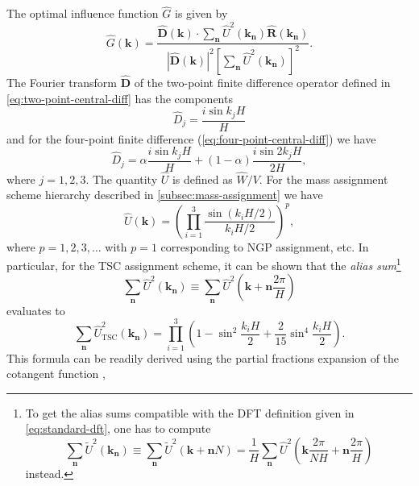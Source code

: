 The optimal influence function $\hat{G}$ is given by
\begin{equation*}
    \hat{G}(\mathbf{k}) = \frac{\hat{\mathbf{D}}(\mathbf{k}) \cdot \sum_{\mathbf{n}}\hat{U}^2(\mathbf{k_\mathbf{n}}) \hat{\mathbf{R}}(\mathbf{k}_\mathbf{n})}{|\hat{\mathbf{D}}(\mathbf{k})|^2 \left[ \sum_{\mathbf{n}}\hat{U}^2(\mathbf{k}_\mathbf{n}) \right]^2}.
\end{equation*}
The Fourier transform $\hat{\mathbf{D}}$ of the two-point finite difference operator defined in \autoref{eq:two-point-central-diff} has the components
\begin{equation*}
    \hat{D}_j = \frac{i\sin k_j H}{H}
\end{equation*}
and for the four-point finite difference (\autoref{eq:four-point-central-diff}) we have
\begin{equation*}
    \hat{D}_j = \alpha\frac{i\sin k_j H}{H} + (1- \alpha)\frac{i\sin 2k_j H}{2H},
\end{equation*}
where $j=1,2,3$.
The quantity $\hat{U}$ is defined as $\hat{W}/V$.
For the mass assignment scheme hierarchy described in \autoref{subsec:mass-assignment} we have
\begin{equation*}
    \hat{U}(\mathbf{k}) = \left(\prod_{i=1}^{3}\frac{\sin(k_i H / 2)}{k_i H / 2}\right)^{p},
\end{equation*}
where $p=1,2,3,\dots$ with $p=1$ corresponding to NGP assignment, etc.
In particular, for the TSC assignment scheme, it can be shown that the \textit{alias sum}\footnote{
    To get the alias sums compatible with the DFT definition given in \autoref{eq:standard-dft}, one has to compute
    \begin{equation*}
        \sum_{\mathbf{n}} \tilde{U}^2(\mathbf{k}_\mathbf{n})
        \equiv \sum_\mathbf{n}\tilde{U}^2(\mathbf{k}+\mathbf{n}N)
        = \frac{1}{H}\sum_\mathbf{n}\hat{U}^2\left(\mathbf{k}\frac{2\pi}{NH}+\mathbf{n}\frac{2\pi}{H}\right)
    \end{equation*}
    instead.
}
\begin{equation*}
    \sum_{\mathbf{n}}\hat{U}^2(\mathbf{k}_\mathbf{n})
    \equiv \sum_{\mathbf{n}}\hat{U}^2\left(\mathbf{k} + \mathbf{n}\frac{2\pi}{H}\right)
\end{equation*}
evaluates to
\begin{equation*}
    \sum_{\mathbf{n}}\hat{U}_\text{TSC}^2(\mathbf{k}_\mathbf{n})
    = \prod_{i=1}^{3} \left(1 - \sin^2\frac{k_i H}{2} + \frac{2}{15}\sin^4\frac{k_i H}{2}\right).
\end{equation*}
This formula can be readily derived using the partial fractions expansion of the cotangent function \cite{aigner2018proofs},
